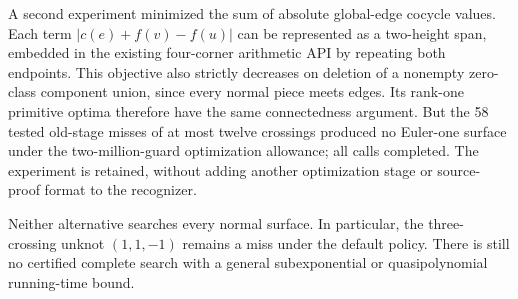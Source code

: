 A second experiment minimized the sum of absolute global-edge cocycle
values. Each term $|c(e)+f(v)-f(u)|$ can be represented as a two-height
span, embedded in the existing four-corner arithmetic API by repeating
both endpoints. This objective also strictly decreases on deletion of a
nonempty zero-class component union, since every normal piece meets edges.
Its rank-one primitive optima therefore have the same connectedness
argument. But the 58 tested old-stage misses of at most twelve crossings
produced no Euler-one surface under the two-million-guard optimization
allowance; all calls completed. The experiment is retained, without adding
another optimization stage or source-proof format to the recognizer.

Neither alternative searches every normal surface. In particular, the
three-crossing unknot $(1,1,-1)$ remains a miss under the default policy.
There is still no certified complete search with a general subexponential
or quasipolynomial running-time bound.


